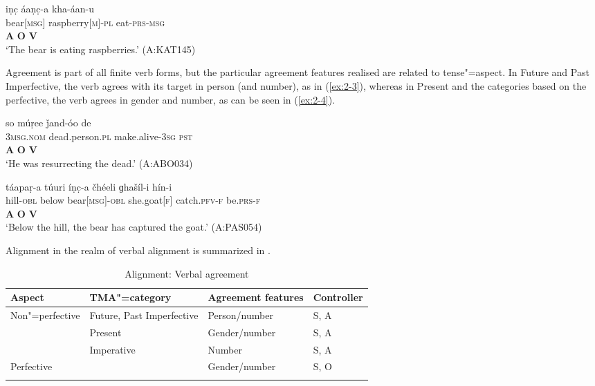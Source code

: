 \begin{exe}
\ex
\label{ex:2-2}
\glll iṇc̣ áaṇc̣-a kha-áan-u\\
bear[\textsc{msg}] raspberry[\textsc{m}]-\textsc{pl} eat-\textsc{prs-msg} \\
\textbf{A} \textbf{O} \textbf{V}\\
\glt `The bear is eating raspberries.' (A:KAT145)
\end{exe} 


Agreement is part of all finite verb forms, but the particular agreement features realised are related to tense"=aspect. In Future and Past Imperfective, the verb agrees with its target in person (and number), as in (\ref{ex:2-3}), whereas in Present and the categories based on the perfective, the verb agrees in gender and number, as can be seen in (\ref{ex:2-4}).

\begin{exe}
\ex
\label{ex:2-3}
\glll so múṛee ǰand-óo de \\
\textsc{3msg.nom} dead.person.\textsc{pl} make.alive-\textsc{3sg} \textsc{pst} \\
\textbf{A} \textbf{O} \textbf{V} \\
\glt `He was resurrecting the dead.' (A:ABO034)
\end{exe}

\begin{exe}
\ex
\label{ex:2-4}
\glll táapaṛ-a túuri íṇc̣-a čhéeli ɡhašíl-i hín-i \\ 
hill-\textsc{obl} below bear[\textsc{msg}]-\textsc{obl} she.goat[\textsc{f}] catch.\textsc{pfv-f} be.\textsc{prs-f} \\
{} {} \textbf{A} \textbf{O} \textbf{V} \\
\glt `Below the hill, the bear has captured the goat.' (A:PAS054)
\end{exe}


Alignment in the realm of verbal alignment is summarized in . 


\begin{table}[ht]
\caption{Alignment: Verbal agreement}
\begin{tabularx}{\textwidth}{ l l Q Q }
\lsptoprule
Aspect &
TMA"=category &
Agreement features &
Controller \\\hline
Non"=perfective &
Future, Past Imperfective &
Person/number &
S, A \\
&
Present &
Gender/number &
S, A \\
&
Imperative &
Number &
S, A \\
Perfective &
&
Gender/number &
S, O \\\lspbottomrule
\end{tabularx}
\label{tab:2-verbagr}
\end{table}


